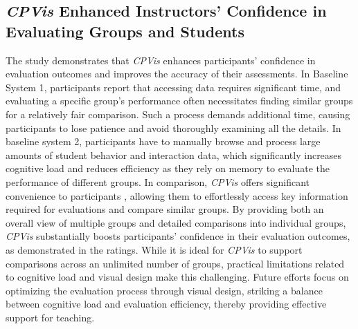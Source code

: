 {\subsection{\textit{CPVis} Enhanced Instructors' Confidence in Evaluating Groups and Students}
The study demonstrates that \textit{CPVis} enhances participants' confidence in evaluation outcomes and improves the accuracy of their assessments. In Baseline System 1, participants report that accessing data requires significant time, and evaluating a specific group's performance often necessitates finding similar groups for a relatively fair comparison. 
Such a process demands additional time, causing participants to lose patience and avoid thoroughly examining all the details.
In baseline system 2, participants have to manually browse and process large amounts of student behavior and interaction data, which significantly increases cognitive load and reduces efficiency as they rely on memory to evaluate the performance of different groups.
In comparison, \textit{CPVis} offers significant convenience to participants , allowing them to effortlessly access key information required for evaluations and compare similar groups. By providing both an overall view of multiple groups and detailed comparisons into individual groups, \textit{CPVis} substantially boosts participants' confidence in their evaluation outcomes, as demonstrated in the ratings. 
While it is ideal for \textit{CPVis} to support comparisons across an unlimited number of groups, practical limitations related to cognitive load and visual design make this challenging. Future efforts focus on optimizing the evaluation process through visual design, striking a balance between cognitive load and evaluation efficiency, thereby providing effective support for teaching.



}
